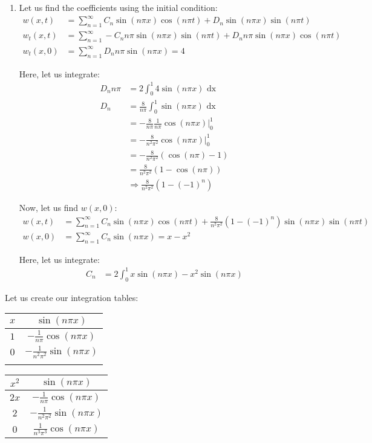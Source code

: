 \documentclass{article}
\begin{document}
\begin{enumerate}
\begin{enumerate}
    \item Let us find the coefficients using the initial condition:
    \begin{align}
      w(x, t) & = \sum^\infty_{n = 1}
      C_n \sin(n \pi x) \cos(n \pi t) + D_n \sin(n \pi x) \sin(n \pi t)\\
      w_t(x, t) & = \sum^\infty_{n = 1}
      -C_n n \pi \sin(n \pi x) \sin(n \pi t) + D_n n \pi \sin(n \pi x) \cos(n \pi t)\\
      w_t(x, 0) & = \sum^\infty_{n = 1}
      D_n n \pi \sin(n \pi x) = 4
    \end{align}

    Here, let us integrate:
    \begin{align}
      D_n n \pi & = 2 \int^1_0 4 \sin(n \pi x) \text{ dx}\\
      D_n & = \frac{8}{n \pi} \int^1_0 \sin(n \pi x) \text{ dx}\\
      & = - \frac{8}{n \pi} \frac{1}{n \pi} \cos(n \pi x) \Big|^1_0\\
      & = - \frac{8}{n^2 \pi^2} \cos(n \pi x) \Big|^1_0\\
      & = - \frac{8}{n^2 \pi^2} (\cos(n \pi) - 1)\\
      & = \frac{8}{n^2 \pi^2} (1 - \cos(n \pi))\\
      & \Rightarrow \frac{8}{n^2 \pi^2} (1 - (-1)^n)
    \end{align}

    Now, let us find $w(x, 0)$:
    \begin{align}
      w(x, t) & = \sum^\infty_{n = 1} C_n \sin(n \pi x) \cos(n \pi t) + \frac{8}{n^2 \pi^2} (1 - (-1)^n) \sin(n \pi x) \sin(n \pi t)\\
      w(x, 0) & = \sum^\infty_{n = 1} C_n \sin(n \pi x) = x - x^2
    \end{align}

    Here, let us integrate:
    \begin{align}
      C_n & = 2 \int^1_0 x \sin(n \pi x) - x^2 \sin(n \pi x)
    \end{align}
  \end{enumerate}

  Let us create our integration tables:
  \begin{center}
    \begin{tabular}{c|c}
      $x$ & $\sin(n \pi x)$\\
      \hline
      $1$ & $-\frac{1}{n \pi} \cos(n \pi x)$\\
      \hline
      $0$ & $-\frac{1}{n^2 \pi^2} \sin(n \pi x)$\\
      &
    \end{tabular}
    \begin{tabular}{c|c}
      $x^2$ & $\sin(n \pi x)$\\
      \hline
      $2x$ & $-\frac{1}{n \pi} \cos(n \pi x)$\\
      \hline
      $2$ & $-\frac{1}{n^2 \pi^2} \sin(n \pi x)$\\
      \hline
      $0$ & $\frac{1}{n^3 \pi^3} \cos(n \pi x)$
    \end{tabular}
  \end{center}


\end{enumerate}
\end{document}
